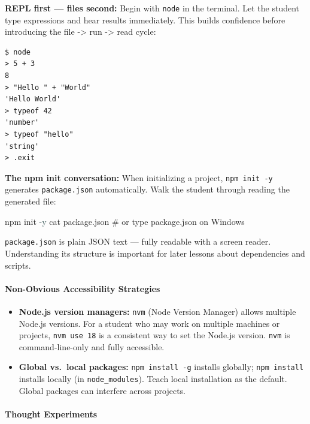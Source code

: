 \documentclass[
  justified,
  openright,
]{tufte-book}
\let\paragraph\paragraph
\newcommand{\AttributeTok}[1]{\textcolor{DarkSlateGray}{#1}}
\newcommand{\CommentTok}[1]{\textcolor{MidGray}{#1}}
\newcommand{\ExtensionTok}[1]{#1}
\newcommand{\FunctionTok}[1]{\textcolor{BrandBlue}{#1}}
\newcommand{\NormalTok}[1]{#1}
\newenvironment{Shaded}{%
  \begin{snugshade}
}{%
  \end{snugshade}
}
\let\paragraph\paragraph
\providecommand{\tightlist}{%
  \setlength{\itemsep}{0pt}\setlength{\parskip}{0pt}}
\begin{document}
\textbf{REPL first --- files second:} Begin with \texttt{node} in the
terminal. Let the student type expressions and hear results immediately.
This builds confidence before introducing the file -\textgreater{} run
-\textgreater{} read cycle:

\begin{verbatim}
$ node
> 5 + 3
8
> "Hello " + "World"
'Hello World'
> typeof 42
'number'
> typeof "hello"
'string'
> .exit
\end{verbatim}

\textbf{The npm init conversation:} When initializing a project,
\texttt{npm\ init\ -y} generates \texttt{package.json} automatically.
Walk the student through reading the generated file:

\begin{Shaded}
\begin{Highlighting}[]
\ExtensionTok{npm}\NormalTok{ init }\AttributeTok{{-}y}
\FunctionTok{cat}\NormalTok{ package.json   }\CommentTok{\# or type package.json on Windows}
\end{Highlighting}
\end{Shaded}

\texttt{package.json} is plain JSON text --- fully readable with a
screen reader. Understanding its structure is important for later
lessons about dependencies and scripts.

\paragraph{Non-Obvious Accessibility
Strategies}\label{non-obvious-accessibility-strategies}

\begin{itemize}
\tightlist
\item
  \textbf{Node.js version managers:} \texttt{nvm} (Node Version Manager)
  allows multiple Node.js versions. For a student who may work on
  multiple machines or projects, \texttt{nvm\ use\ 18} is a consistent
  way to set the Node.js version. \texttt{nvm} is command-line-only and
  fully accessible.
\item
  \textbf{Global vs.~local packages:} \texttt{npm\ install\ -g} installs
  globally; \texttt{npm\ install} installs locally (in
  \texttt{node\_modules}). Teach local installation as the default.
  Global packages can interfere across projects.
\end{itemize}

\paragraph{Thought Experiments}\label{thought-experiments}
\end{document}
